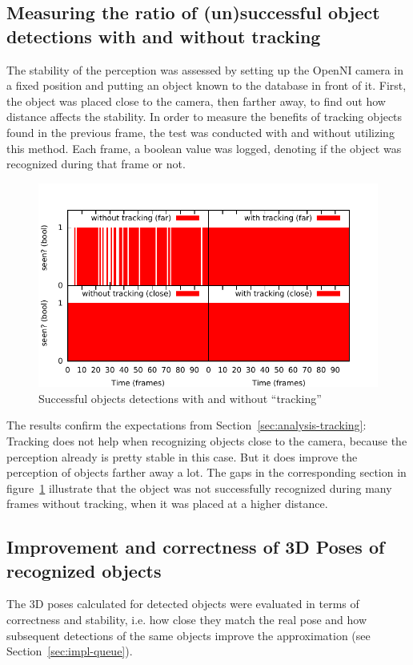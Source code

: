 \subsection{Measuring the ratio of (un)successful object detections with and without tracking}
\label{sec:experiment-tracking}
The stability of the perception was assessed by setting up the OpenNI camera in a fixed position and putting an object known to the database in front of it. First, the object was placed close to the camera, then farther away, to find out how distance affects the stability. In order to measure the benefits of tracking objects found in the previous frame, the test was conducted with and without utilizing this method. Each frame, a boolean value was logged, denoting if the object was recognized during that frame or not.
\begin{figure}[H]
  \includegraphics[width=1.0\textwidth]{images/perceptions.pdf}
  \caption{Successful objects detections with and without ``tracking''}
  \label{fig:analysis-perceptions}
\end{figure}

The results confirm the expectations from Section~\ref{sec:analysis-tracking}: Tracking does not help when recognizing objects close to the camera, because the perception already is pretty stable in this case. But it does improve the perception of objects farther away a lot. The gaps in the corresponding section in figure~\ref{fig:analysis-perceptions} illustrate that the object was not successfully recognized during many frames without tracking, when it was placed at a higher distance.


\subsection{Improvement and correctness of 3D Poses of recognized objects}
\label{sec:experiment-poses}
The 3D poses calculated for detected objects were evaluated in terms of correctness and stability, i.e. how close they match the real pose and how subsequent detections of the same objects improve the approximation (see Section~\ref{sec:impl-queue}).

